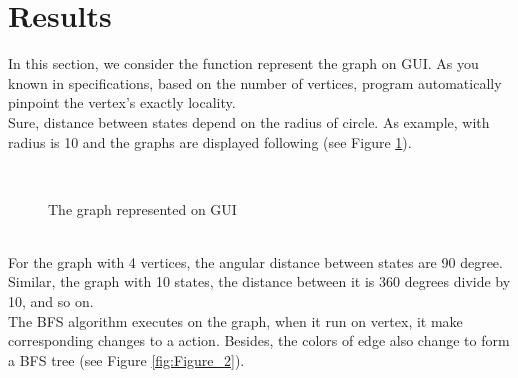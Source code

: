 \section{Results}
In this section, we consider the function represent the graph on GUI. As you known in specifications, based on the number of vertices, program automatically pinpoint the vertex's exactly locality.
\\[0.5cm]
Sure, distance between states depend on the radius of circle. As example, with radius is 10 and the graphs are displayed following (see Figure \ref{fig:Figure_1}).
\begin{figure}[h!]
\centering
{}~~
~~
\caption{The graph represented on GUI}
\label{fig:Figure_1}
\end{figure}\\
For the graph with 4 vertices, the angular distance between states are 90 degree. Similar, the graph with 10 states, the distance between it is 360 degrees divide by 10, and so on.
\\
The BFS algorithm executes on the graph, when it run on vertex, it make corresponding changes to a action. Besides, the colors of edge also change to form a BFS tree (see Figure \ref{fig:Figure_2}).\\
